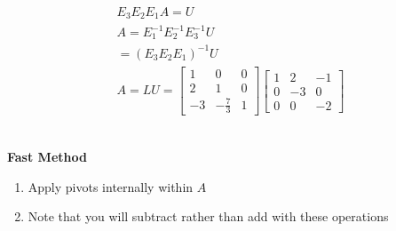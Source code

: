 \documentclass[10pt]{article}
\begin{document}
\begin{multicols}{2}
\begin{minipage}{\columnwidth}
\begin{minipage}{0.5\linewidth}
        \begin{align*}
            E_3 E_2 E_1 A = U \\
            A = E_1^{-1} E_2^{-1} E_3^{-1} U \\
            = (E_3 E_2 E_1)^{-1} U \\
            A = LU = \begin{bmatrix}
                1 & 0 & 0 \\
                2 & 1 & 0 \\
                -3 & -\frac{7}{3} & 1
            \end{bmatrix}
            \begin{bmatrix}
                1 & 2 & -1 \\
                0 & -3 & 0 \\
                0 & 0 & -2
            \end{bmatrix}
        \end{align*}
    \end{minipage} \\
    \textbf{Fast Method}
    \begin{enumerate}
        \item Apply pivots internally within \(A\)
        \item Note that you will subtract rather than add with these operations
    \end{enumerate}


\end{minipage}
\end{multicols}
\end{document}
